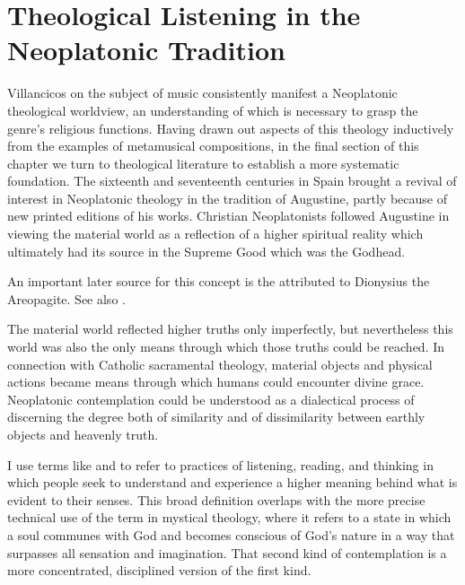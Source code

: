 
\section{Theological Listening in the Neoplatonic Tradition}

Villancicos on the subject of music consistently manifest a Neoplatonic
theological worldview, an understanding of which is necessary to grasp the
genre's religious functions.
Having drawn out aspects of this theology inductively from the examples of
metamusical compositions, in the final section of this chapter we turn to
theological literature to establish a more systematic foundation.
The sixteenth and seventeenth centuries in Spain brought a revival of interest
in Neoplatonic theology in the tradition of Augustine, partly because of new
printed editions of his works.%
    \Autocite{Weber:ReligiousLitSpain}
Christian Neoplatonists followed Augustine in viewing the material
world as a reflection of a higher spiritual reality which ultimately had its
source in the Supreme Good which was the Godhead.%
\begin{Footnote}
    An important later source for this concept is the  attributed to Dionysius the Areopagite.
    See also \autocite{Knighton:Mysticism}.
\end{Footnote}
The material world reflected higher truths only imperfectly, but nevertheless
this world was also the only means through which those truths could be reached.
In connection with Catholic sacramental theology, material objects and physical
actions became means through which humans could encounter divine grace.
Neoplatonic contemplation could be understood as a dialectical process of
discerning the degree both of similarity and of dissimilarity between earthly
objects and heavenly truth.%
\begin{Footnote}
    I use terms like  and  to
    refer to practices of listening, reading, and thinking in which people 
    seek to understand and experience a higher meaning behind what is evident
    to their senses. 
    This broad definition overlaps with the more precise technical use of
    the term  in mystical theology, where it refers to
    a state in which a soul communes with God and becomes conscious of God's
    nature in a way that surpasses all sensation and imagination.
    That second kind of contemplation is a more concentrated, disciplined
    version of the first kind.
\end{Footnote}

